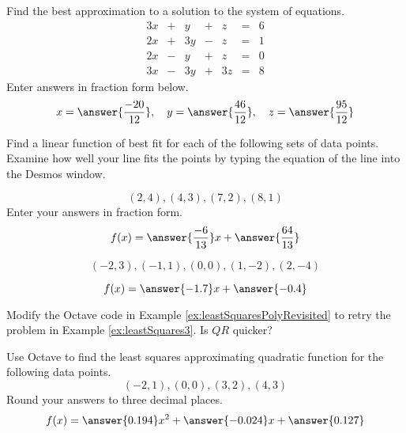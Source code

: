 \documentclass{ximera}
\begin{document}
\begin{problem}\label{prob:leastSq1}
Find the best approximation to a solution to the system of equations.
$$\begin{matrix}3x&+&y&+&z&=&6\\2x&+&3y&-&z&=&1\\2x&-&y&+&z&=&0\\3x&-&3y&+&3z&=&8\end{matrix}$$
Enter answers in fraction form below.
$$x=\answer{\frac{-20}{12}},\quad y=\answer{\frac{46}{12}},\quad z=\answer{\frac{95}{12}}$$
\end{problem}

\begin{problem}
Find a linear function of best fit for each of the following sets of data points.  Examine how well your line fits the points by typing the equation of the line into the Desmos window.

\begin{problem}\label{prob:leastSq2a}
$$(2,4), (4,3), (7,2), (8,1)$$
Enter your answers in fraction form.
$$f(x)=\answer{\frac{-6}{13}}x+\answer{\frac{64}{13}}$$
\begin{onlineOnly}
\begin{center}
\end{center}
\end{onlineOnly}
\end{problem}

\begin{problem}\label{prob:leastSq2b}
$$(-2, 3), (-1,1), (0,0), (1, -2), (2, -4)$$

$$f(x)=\answer{-1.7}x+\answer{-0.4}$$
\begin{onlineOnly}
\begin{center}
\end{center}
\end{onlineOnly}
\end{problem}
\end{problem}

\begin{problem}\label{prob:useOctave}
    Modify the Octave code in Example \ref{ex:leastSquaresPolyRevisited} to retry the problem in Example \ref{ex:leastSquares3}.  Is $QR$ quicker?
\end{problem}

\begin{problem}\label{prob:leastSq3}
Use Octave to find the least squares approximating quadratic function for the following data points.
$$(-2,1),(0,0),(3,2),(4,3)$$
Round your answers to three decimal places.
$$f(x)=\answer{0.194}x^2+\answer{-0.024}x+\answer{0.127}$$
\end{problem}
\end{document}
